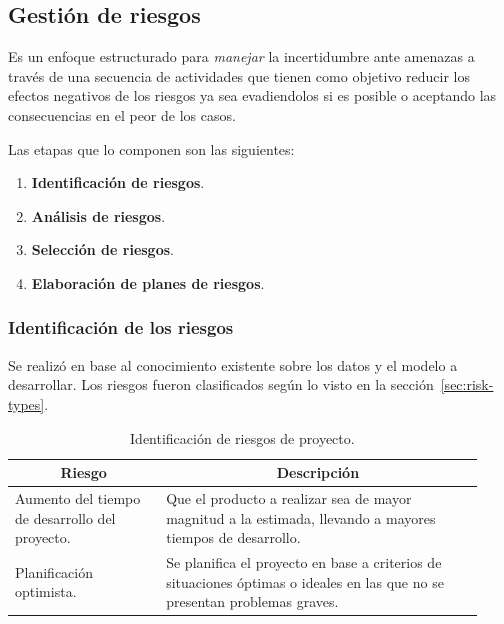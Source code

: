 \documentclass[a4paper,12pt]{article}
\begin{document}
\subsection{Gestión de riesgos}
Es un enfoque estructurado para \textit{manejar} la incertidumbre ante amenazas a través de una secuencia de actividades que tienen como objetivo reducir los efectos negativos de los riesgos ya sea evadiendolos si es posible o aceptando las consecuencias en el peor de los casos. 

Las etapas que lo componen son las siguientes:
\begin{enumerate}[noitemsep, topsep=2pt]
	\item \textbf{Identificación de riesgos}.
	\item \textbf{Análisis de riesgos}.
	\item \textbf{Selección de riesgos}.
	\item \textbf{Elaboración de planes de riesgos}.
\end{enumerate}

\subsubsection{Identificación de los riesgos}
Se realizó en base al conocimiento existente sobre los datos y el modelo a desarrollar. Los riesgos fueron clasificados según lo visto en la sección~\ref{sec:risk-types}.

\begin{table}[H]
	\centering
	\begin{tabular}{p{0.3\linewidth} p{0.63\linewidth}}
		\hline
		\multicolumn{1}{c}{\textbf{Riesgo}}            &   
		\multicolumn{1}{c}{\textbf{Descripción}} \\ \hline
		Aumento del tiempo de desarrollo del proyecto. &   
		Que el producto a realizar sea de mayor magnitud a la estimada, llevando a mayores tiempos de desarrollo. \\
		Planificación optimista.                      &   
		Se planifica el proyecto en base a criterios de situaciones óptimas o ideales en las que no se presentan problemas graves. \\ \hline
	\end{tabular}
	\caption{Identificación de riesgos de proyecto.}
	\label{tab:project-risks}
\end{table}
\end{document}
